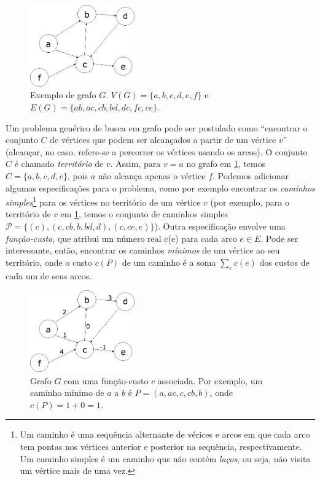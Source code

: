 \begin{figure}[!h]
  \centering
  \includegraphics[width=0.4\textwidth]{picstcc/graph.png}
  \caption{Exemplo de grafo $G$. $V(G) = \{a,b,c,d,e,f\}$ e $E(G) =\{ab, ac, cb, bd, dc, fc, ce\}$.}
  \label{graph}
\end{figure}

Um problema genérico de busca em grafo pode ser postulado como ``encontrar o conjunto $C$ de vértices que podem ser alcançados a partir de um vértice $v$'' (alcançar, no caso, refere-se a percorrer os vértices usando os arcos). O conjunto $C$ é chamado \textit{território} de $v$. Assim, para $v = a$ no grafo em \ref{graph}, temos $C = \{ a, b, c, d, e\}$, pois $a$ não alcança apenas o vértice $f$. Podemos adicionar algumas especificações para o problema, como por exemplo encontrar os \textit{caminhos simples}\footnote{Um caminho é uma sequência alternante de vérices e arcos em que cada arco tem pontas nos vértices anterior e posterior na sequência, respectivamente. Um caminho simples é um caminho que não contém \textit{laços}, ou seja, não visita um vértice mais de uma vez.} para os vértices no território de um vértice $v$ (por exemplo, para o território de $c$ em \ref{graph}, temos o conjunto de caminhos simples $\mathcal{P} = \{(c), (c,cb,b,bd,d), (c, ce, e)\}$). Outra especificação envolve uma \textit{função-custo}, que atribui um número real c(e) para cada arco $e \in E$. Pode ser interessante, então, encontrar os caminhos \textit{mínimos} de um vértice ao seu território, onde o custo $c(P)$ de um caminho é a soma $\sum_ec(e)$ dos custos de cada um de seus arcos.

\begin{figure}[!h]
  \centering
  \includegraphics[width=0.4\textwidth]{picstcc/costedgraph.png}
  \caption{Grafo $G$ com uma função-custo $c$ associada. Por exemplo, um caminho mínimo de $a$ a $b$ é $P = (a, ac, c, cb, b)$, onde $c(P) = 1 + 0 = 1.$}
  \label{costedgraph}
\end{figure}

